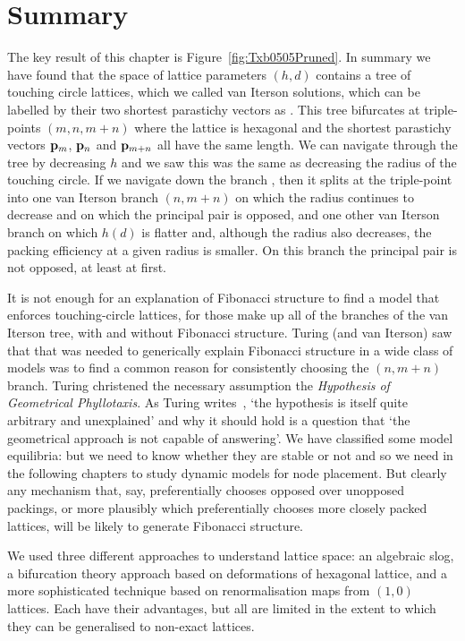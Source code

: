 \section{Summary}
\label{sec:ClassifyingSummary}
The key result of this chapter is Figure~\ref{fig:Txb0505Pruned}. In summary we have found that the space of lattice parameters $(h,d)$ contains a tree of touching circle lattices, which we called van Iterson solutions, which can be  labelled by their two shortest parastichy vectors as . This tree bifurcates at triple-points $(m,n,m+n)$ where the lattice is hexagonal and the shortest parastichy vectors ${\mathbf p}_{m}$, ${\mathbf p}_{n}$ and ${\mathbf p}_{m+n}$ all have the same length. We can navigate through the tree by decreasing $h$ and we saw this was the same as decreasing the radius of the touching circle. If we navigate down the branch , then it splits at the triple-point
into one van Iterson branch $(n,m+n)$ on which the radius continues to decrease and on which the principal pair is opposed, and one other van Iterson branch on which  $h(d)$ is flatter and, although the radius also decreases, the packing efficiency at a given radius is smaller. On this branch the principal pair is not opposed, at least at first. 


It is not enough for an explanation of Fibonacci structure to find a model that enforces touching-circle lattices, for those make up all of the branches of the van Iterson tree, with and without Fibonacci structure. Turing (and van Iterson)  saw that that was needed to generically explain Fibonacci structure in a wide class of models was to find a common reason for consistently choosing the $(n,m+n)$ branch. Turing christened the necessary assumption the \emph{Hypothesis of Geometrical Phyllotaxis}. As Turing writes~\autocite{turingMorphogenTheoryPhyllotaxis2013}, 
`the hypothesis is itself quite arbitrary and unexplained' and why it should hold is a question that `the geometrical approach is not capable of answering'. We have classified some model equilibria: but we need to know whether they are stable or not and so we need in the following chapters to study dynamic models for node placement. But clearly any mechanism that, say,  preferentially chooses opposed over unopposed packings, or more plausibly which preferentially chooses more closely packed lattices, will be likely to generate Fibonacci structure.

We used three different approaches to understand lattice space: an algebraic slog, a bifurcation theory approach based on deformations of hexagonal lattice, and a more sophisticated technique based on renormalisation maps from  $(1,0)$ lattices. Each have their advantages, but all are limited in the extent to which they can be generalised to non-exact lattices. 

